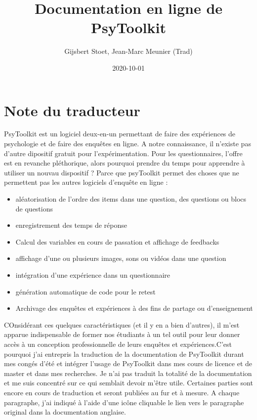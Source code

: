\documentclass[
]{book}
\title{Documentation en ligne de PsyToolkit}
\author{Gijsbert Stoet, Jean-Marc Meunier (Trad)}
\date{2020-10-01}
\providecommand{\tightlist}{%
  \setlength{\itemsep}{0pt}\setlength{\parskip}{0pt}}
\begin{document}
\frontmatter
\maketitle

\mainmatter
\hypertarget{note-du-traducteur}{%
\chapter*{Note du traducteur}\label{note-du-traducteur}}

PsyToolkit est un logiciel deux-en-un permettant de faire des
expériences de psychologie et de faire des enquêtes en ligne. A notre
connaissance, il n'existe pas d'autre dipositif gratuit pour
l'expérimentation. Pour les questionnaires, l'offre est en revanche
pléthorique, alors pourquoi prendre du temps pour apprendre à utiliser
un nouvau dispositif ? Parce que psyToolkit permet des choses que ne
permettent pas les autres logiciels d'enquête en ligne :

\begin{itemize}
\tightlist
\item
  aléatorisation de l'ordre des items dans une question, des questions
  ou blocs de questions
\item
  enregistrement des temps de réponse
\item
  Calcul des variables en cours de passation et affichage de feedbacks
\item
  affichage d'une ou plusieurs images, sons ou vidéos dans une question
\item
  intégration d'une expérience dans un questionnaire
\item
  génération automatique de code pour le retest
\item
  Archivage des enquêtes et expériences à des fins de partage ou
  d'enseignement
\end{itemize}

COnsidérant ces quelques caractéristiques (et il y en a bien d'autres),
il m'est apparue indispensable de former nos étudiants à un tel outil
pour leur donner accès à un conception professionnelle de leurs enquêtes
et expériences.C'est pourquoi j'ai entrepris la traduction de la
documentation de PsyToolkit durant mes congés d'été et intégrer l'usage
de PsyToolkit dans mes cours de licence et de master et dans mes
recherches. Je n'ai pas traduit la totalité de la documentation et me
suis concentré sur ce qui semblait devoir m'être utile. Certaines
parties sont encore en cours de traduction et seront publiées au fur et
à mesure. A chaque paragraphe, j'ai indiqué à l'aide d'une icône
cliquable le lien vers le paragraphe original dans la documentation
anglaise.
\end{document}
